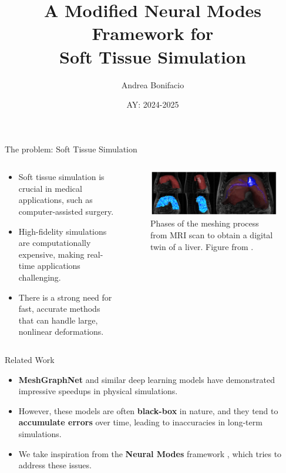 \documentclass{beamer}
\title{A Modified Neural Modes Framework for\\ Soft Tissue Simulation}
\author{Andrea Bonifacio }
\date{AY: 2024-2025  \vspace{-5em} \hspace{2cm} \supervisors{Prof. Stefano Pagani}{Dr. Stéphane Cotin}
}
\begin{document}
\begin{frame}
\titlepage
\end{frame}

\begin{frame}{The problem: Soft Tissue Simulation}
    \begin{columns}[T]
        \begin{column}{0.6\textwidth}
            \begin{itemize}
                \item Soft tissue simulation is crucial in medical applications, such as computer-assisted surgery.
                \item High-fidelity simulations are computationally expensive, making real-time applications challenging.
                \item There is a strong need for fast, accurate methods that can handle large, nonlinear deformations.
            \end{itemize}
        \end{column}
        \begin{column}{0.4\textwidth}
            \begin{figure}
                \centering
                    \includegraphics[width=\textwidth]{Images/liver.png}
                    \caption{Phases of the meshing process from MRI scan to obtain a digital twin of a liver. Figure from \cite{Courtecuisse_Peterlik_Trivisonne_Duriez_Cotin_2014}.}
            \end{figure}
        \end{column}
    \end{columns}
\end{frame}

\begin{frame}{Related Work}
    \begin{itemize}
        \item \textbf{MeshGraphNet} \cite{pfaffLearningMeshBasedSimulation2021a} and similar deep learning models have demonstrated impressive speedups in physical simulations.
        \item However, these models are often \textbf{black-box} in nature, and they tend to \textbf{accumulate errors} over time, leading to inaccuracies in long-term simulations.
        \item  We take inspiration from the \textbf{Neural Modes} framework \cite{Wang_Du_Coros_Thomaszewski_2024}, which tries to address these issues.
    \end{itemize}
\end{frame}
\end{document}
